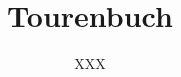 


\newif\iftourbuch
\tourbuchtrue   %
\iftourbuch
	\title{Tourenbuch}
	\author{XXX}
	\maketitle
	\tableofcontents
\fi




%
%





